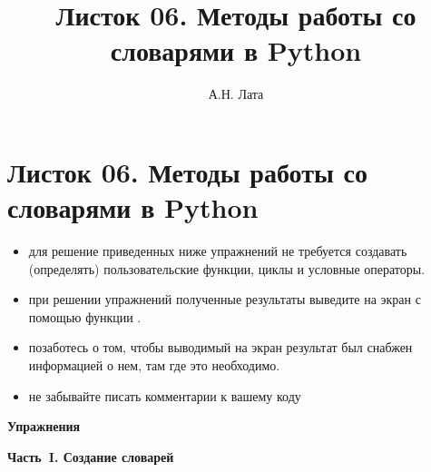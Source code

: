 \documentclass[a4,12pt]{article}
\title{Листок 06. Методы работы со словарями в Python}
\author{А.Н. Лата}
\theoremstyle{remark}
\begin{document}
 


\section*{\centering Листок 06. Методы работы со словарями в Python}

\begin{exercisenote}[title=Замечания]
\begin{itemize}
    \item для решение приведенных ниже упражнений не требуется создавать (определять) пользовательские функции, циклы и условные операторы.
    \item при решении упражнений полученные результаты выведите на экран с помощью функции {\color{blue}{print()}}.
    \item позаботесь о том, чтобы выводимый на экран результат был снабжен информацией о нем, там где это необходимо.
    \item не забывайте писать комментарии к вашему коду
\end{itemize}
\end{exercisenote}

\textbf{Упражнения}

\bigskip
\noindent\textbf{Часть~I. Создание словарей}
\end{document}
